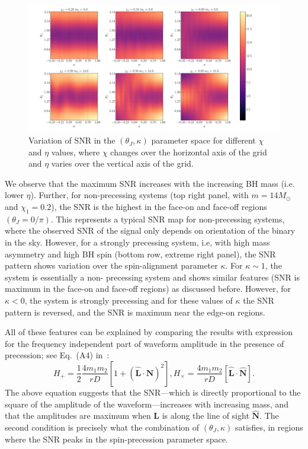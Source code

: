 \begin{figure}[t]
\includegraphics[width=\textwidth]{images/SNR_0F.pdf}
\caption{Variation of SNR in the $(\theta_J, \kappa)$ parameter space for 
different $\chi$ and $\eta$ values, where $\chi$ changes over the horizontal 
axis of the grid and $\eta$ varies over the vertical axis of the grid.}
\centering 
\label{fig:SNR} 
\end{figure}

We observe that the maximum SNR increases with the increasing BH mass (i.e.
lower $\eta$). Further, for non-precessing systems (top right panel, with
$m=14 M_\odot$ and $\chi_1=0.2$), the SNR is the highest in the face-on and
face-off regions $(\theta_{J} = 0/\pi)$. This represents a typical SNR map for
non-precessing systems, where the observed SNR of the signal only depends on
orientation of the binary in the sky. However, for a strongly precessing
system, i.e, with high mass asymmetry and high BH spin (bottom row, extreme
right panel), the SNR pattern shows variation over the spin-alignment
parameter $\kappa$. For $\kappa \sim 1$, the system is essentially a non-
precessing system and shows similar features (SNR is maximum in the face-on
and face-off regions) as discussed before. However, for $\kappa < 0$, the
system is strongly precessing and for these values of $\kappa$ the SNR pattern
is reversed, and the SNR is maximum near the edge-on regions.

All of these features can be explained by comparing the results with
expression for the frequency independent part of waveform amplitude in the
presence of precession; see Eq.~(A4) in~\cite{Apostolatos1994}:
\label{amplitudes}
\begin{equation}
H_{+} = \frac{1}{2}\frac{4 m_{1}m_{2}}{rD} \left[1 + (\hat{\mathbf{L}}\cdot\hat{\mathbf{N}})^{2}\right], 
H_{\times} = \frac{4 m_{1}m_{2}}{rD}\left[\hat{\mathbf{L}}\cdot\hat{\mathbf{N}}\right].
\end{equation}
The above equation suggests that the SNR---which is directly proportional to
the square of the  amplitude of the waveform---increases with increasing mass,
and that the amplitudes are maximum when $\mathbf{L}$ is along the line of
sight $\hat{\mathbf{N}}$. The second condition is precisely what the
combination of $(\theta_J, \kappa)$ satisfies, in regions where
the SNR peaks in the spin-precession parameter space.

